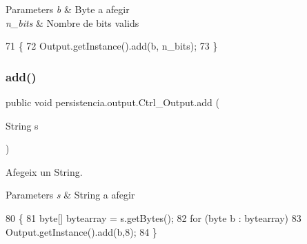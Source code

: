 \begin{DoxyParams}{Parameters}
{\em b} & Byte a afegir \\
\hline
{\em n\+\_\+bits} & Nombre de bits valids \\
\hline
\end{DoxyParams}

\begin{DoxyCode}
71                                             \{
72         Output.getInstance().add(b, n\_bits);
73     \}
\end{DoxyCode}
\mbox{\label{classpersistencia_1_1output_1_1Ctrl__Output_a0e3bedb0b88d0e60b228cc49143e6f0e}} 
\subsubsection{\texorpdfstring{add()}{add()}\hspace{0.1cm}{\footnotesize\ttfamily [2/6]}}
{\footnotesize\ttfamily public void persistencia.\+output.\+Ctrl\+\_\+\+Output.\+add (\begin{DoxyParamCaption}\item[{String}]{s }\end{DoxyParamCaption})\hspace{0.3cm}{\ttfamily [inline]}}



Afegeix un String. 


\begin{DoxyParams}{Parameters}
{\em s} & String a afegir \\
\hline
\end{DoxyParams}

\begin{DoxyCode}
80                               \{
81         byte[] bytearray = s.getBytes();
82         \textcolor{keywordflow}{for} (byte b : bytearray) 
83             Output.getInstance().add(b,8);
84     \}
\end{DoxyCode}
\mbox{\label{classpersistencia_1_1output_1_1Ctrl__Output_a4070b40016edf1d959b3f7c60c90ef10}} 
